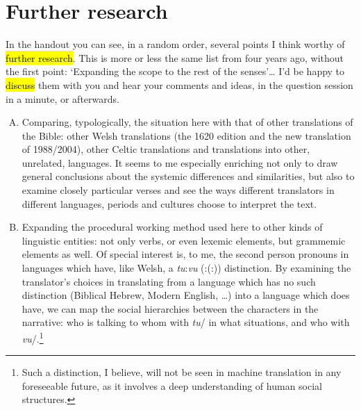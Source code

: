 \section{Further research}

\begin{paper}
	In the handout you can see, in a random order, several points I think worthy of \hl{further research}. This is more or less the same list from four years ago, without the first point: ‘Expanding the scope to the rest of the senses’… I’d be happy to \hl{discuss} them with you and hear your comments and ideas, in the question session in a minute, or afterwards.
\end{paper}


\begin{enumerate}[A.]
	\item Comparing, typologically, the situation here with that of other translations of the Bible: other Welsh translations (the 1620 edition and the new translation of 1988/2004), other Celtic translations and translations into other, unrelated, languages. It seems to me especially enriching not only to draw general conclusions about the systemic differences and similarities, but also to examine closely particular verses and see the ways different translators in different languages, periods and cultures choose to interpret the text.


	\item Expanding the procedural working method used here to other kinds of linguistic entities: not only verbs, or even lexemic elements, but grammemic elements as well. Of special interest is, to me, the second person pronouns in languages which have, like Welsh, a \mbox{\textit{tu}:\textit{vu}} (\mbox{:(:)}) distinction. By examining the translator’s choices in translating from a language which has no such distinction (Biblical Hebrew, Modern English, …) into a language which does have, we can map the social hierarchies between the characters in the narrative: who is talking to whom with \textit{tu}/ in what situations, and who with \textit{vu}/.\footnote{Such a distinction, I believe, will not be seen in machine translation in any foreseeable future, as it involves a deep understanding of {human} social structures.}



\end{enumerate}
